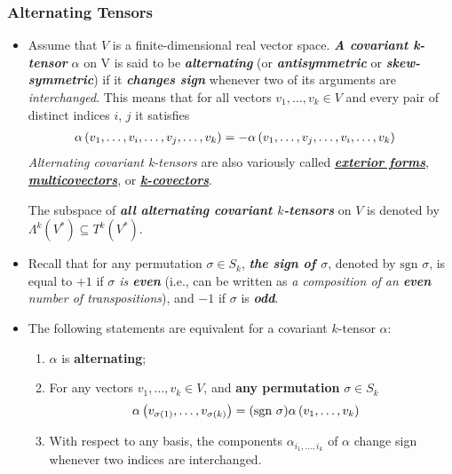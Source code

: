 \documentclass[11pt]{article}
\begin{document}
\subsubsection{Alternating Tensors}
\begin{itemize}
\item \begin{definition}
Assume that $V$ is a finite-dimensional real vector space. \emph{\textbf{A covariant k-tensor}} $\alpha$ on V is said to be \emph{\textbf{alternating}} (or \emph{\textbf{antisymmetric}} or \emph{\textbf{skew-symmetric}}) if it \emph{\textbf{changes sign}} whenever two of its arguments are \emph{interchanged}. This means that for all vectors $v_1,\ldots,v_k \in V$ and every pair of distinct indices $i$, $j$ it satisfies
\begin{align*}
\alpha\left(v_1, \ldots, v_i, \ldots, v_j, \ldots, v_k\right) &= -\alpha\left(v_1, \ldots, v_j, \ldots, v_i, \ldots, v_k\right) 
\end{align*}
\emph{Alternating covariant k-tensors} are also variously called \underline{\emph{\textbf{exterior forms}}, \emph{\textbf{multicovectors}}}, or \underline{\emph{\textbf{k-covectors}}}. 

The subspace of \emph{\textbf{all alternating covariant $k$-tensors}} on $V$ is denoted by \underline{$\Lambda^{k}(V^{*}) \subseteq T^k(V^{*}) $}.
\end{definition}

\item \begin{definition}
Recall that for any permutation $\sigma \in S_k$, \emph{\textbf{the sign of $\sigma$}}, denoted by $\text{sgn }\sigma$, is equal to $+1$ if \emph{$\sigma$ is \textbf{even}} (i.e., can be written as \emph{a composition of an \textbf{even} number of transpositions}), and $-1$ if $\sigma$ is \emph{\textbf{odd}}.
\end{definition}

\item 
\begin{lemma}
The following statements are equivalent for a covariant $k$-tensor $\alpha$:
\begin{enumerate}
\item $\alpha$ is \textbf{alternating};
\item For any vectors $v_1,\ldots,v_k \in V$, and \textbf{any permutation} $\sigma \in S_k$
\begin{align*}
\alpha\left(v_{\sigma(1)}, \ldots,  v_{\sigma(k)}\right) &=(\text{sgn }\sigma)\alpha\left(v_1, \ldots,  v_k\right)
\end{align*}
\item With respect to any basis, the components $\alpha_{i_1,\ldots,i_k}$ of $\alpha$ change sign whenever two indices are interchanged.
\end{enumerate}
\end{lemma}


\end{itemize}
\end{document}
